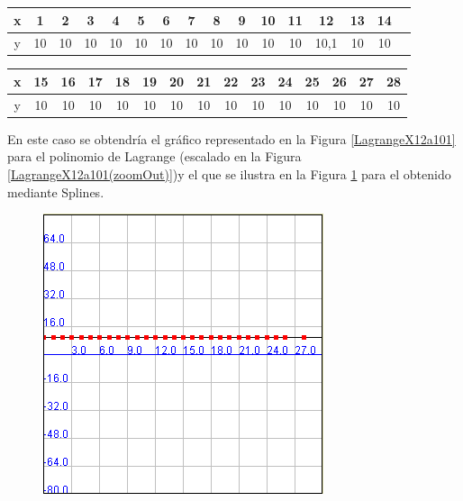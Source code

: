 \documentclass[a4paper]{article}
\begin{document}
\smallskip

\begin{tabular}{ | c || c | c | c | c | c |c | c | c | c | c | c | c | c | c | c |}
 \hline                 
   x & 1 & 2 & 3 & 4 & 5 & 6 & 7 & 8 & 9 & 10 & 11 & 12 & 13 & 14 \\
 \hline    
y & 10 & 10& 10& 10& 10& 10& 10& 10& 10& 10& 10& 10,1& 10 & 10\\
 \hline  
 \end{tabular}

 \smallskip

\begin{tabular}{  | c || c | c | c | c | c | c | c | c | c | c | c | c | c | c | }
 \hline                 
   x&15& 16 & 17 & 18 & 19 & 20 & 21 & 22 & 23 & 24 & 25 & 26 & 27 & 28\\
 \hline    
y & 10 & 10 & 10& 10& 10& 10& 10& 10& 10& 10& 10& 10& 10& 10 \\
 \hline  
 \end{tabular}

\bigskip

 En este caso se obtendría el gráfico representado en la Figura \ref{LagrangeX12a101} para el polinomio de Lagrange (escalado en la Figura \ref{LagrangeX12a101(zoomOut)})y el que se ilustra en la Figura \ref{SplinesX12a101} para el obtenido mediante Splines.\\

\begin{figure}[h!]
	\caption{}
	\begin{center}
	\includegraphics[scale=1]{imagenes/SplinesX12a101}
	\label{SplinesX12a101}
  \end{center}
\end{figure}
\end{document}
